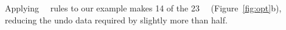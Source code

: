 Applying \nrb\ \patch\ rules to our example makes 14 of the 23 \patches\ \nrb\
(Figure~\ref{fig:opt}b),
%
reducing the undo data required by slightly more than half.


\begin{comment}
%
To avoid this overhead, \Kudos\ identifies \patches\ that will never
need to be reverted and omits their undo data. We call these \emph{\nrb}
\patches. (The opposite naturally being a \emph{\rb} \patch, when
necessary to differentiate them.)
%
Since a \nrb\ \patch\ cannot be reverted, a write of any \patches\
on block $\PB$ must include all \nrb\ \patches\ on $\PB$. To accordingly
update our formal model we define a new set of \patches, \PHard, which
contains all \nrb\ \patches. We write \PHard[\PB] to restrict the set
to block $\PB$\todo{Introduce \PSoft\ and \PSoft[\PB].}:

\begin{tabbing}
\textbf{Write block.} \\
\quad Pick some block $b$ with $\PMem[b] \neq \emptyset$. \\
\quad Pick some $P \subseteq \PMem[b]$ with $\PDepset{P} \subseteq P \cup
\PDisk$ and $\PHard[\PB] \subseteq P$. \\
\quad Move each $p \in P$ to $\PInf$ (in-flight). \\
\quad For each $p \in \PMem[\PB]-P$, set $\PDDepset{p} \gets \PDDepset{p}
\cup P$.
\end{tabbing}

\paragraph{}
To avoid (expensive) dependency traversals to determine whether a new
\patch\ will need to be reverted,
%
\Kudos\ conservatively identifies \nrb\ \patches\ using only local
dependency information.
%
\Kudos\ detects that a new \patch\ on block $\PB$ may need to be reverted if:
\todo{Which form is easier to read? Can we write \(\PMem - \PMem[\PB] - \PEmpty\) more concisely?}
%
\todo{Actually, our implementation also uses in flight \patches. Can we make
it not?}
%
\[ \PRDepset{\PMem[b]} \cap (\PMem - \PMem[b] - \PEmpty) \ne \emptyset \]
\[ \exists \inset{p}{\PMem[b]}\!:\
   \exists c\!:\ \exists \inset{q}{\PMem[c]}\!:\
   \indirdepends{q}{p} \]
%
This is both a safe and useful indicator because
%
the presence of an external \after\ is a necessary condition for a new
\patch's \before\ to induce a block-level cycle
%
and many blocks have no \patches\ with external \afters\ (e.g. most
file data blocks).


\end{comment}
